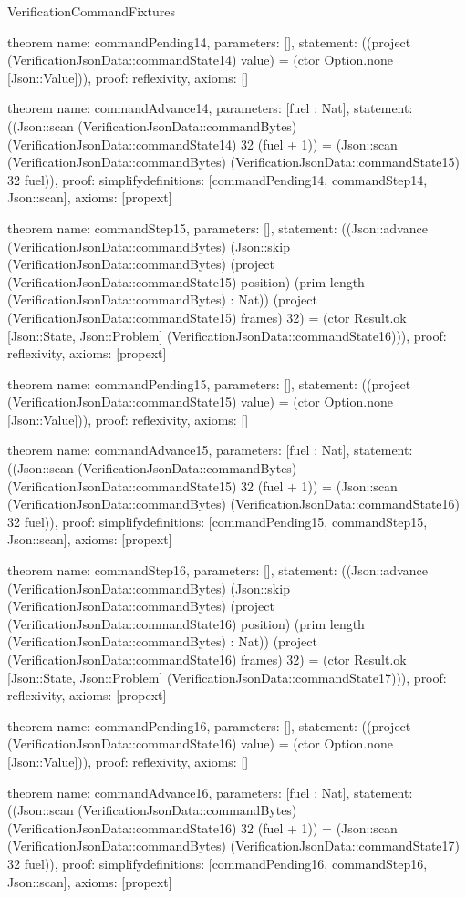 \begin{lexlean}{VerificationCommandFixtures}
\begin{semanticmodule}
theorem{
  name: commandPending14,
  parameters: [],
  statement: ((project (VerificationJsonData::commandState14) value) = (ctor Option.none [Json::Value])),
  proof: reflexivity{},
  axioms: []
}

theorem{
  name: commandAdvance14,
  parameters: [fuel : Nat],
  statement: ((Json::scan (VerificationJsonData::commandBytes) (VerificationJsonData::commandState14) 32 (fuel + 1)) = (Json::scan (VerificationJsonData::commandBytes) (VerificationJsonData::commandState15) 32 fuel)),
  proof: simplify{definitions: [commandPending14, commandStep14, Json::scan]},
  axioms: [propext]
}

theorem{
  name: commandStep15,
  parameters: [],
  statement: ((Json::advance (VerificationJsonData::commandBytes) (Json::skip (VerificationJsonData::commandBytes) (project (VerificationJsonData::commandState15) position) (prim length (VerificationJsonData::commandBytes) : Nat)) (project (VerificationJsonData::commandState15) frames) 32) = (ctor Result.ok [Json::State, Json::Problem] (VerificationJsonData::commandState16))),
  proof: reflexivity{},
  axioms: [propext]
}

theorem{
  name: commandPending15,
  parameters: [],
  statement: ((project (VerificationJsonData::commandState15) value) = (ctor Option.none [Json::Value])),
  proof: reflexivity{},
  axioms: []
}

theorem{
  name: commandAdvance15,
  parameters: [fuel : Nat],
  statement: ((Json::scan (VerificationJsonData::commandBytes) (VerificationJsonData::commandState15) 32 (fuel + 1)) = (Json::scan (VerificationJsonData::commandBytes) (VerificationJsonData::commandState16) 32 fuel)),
  proof: simplify{definitions: [commandPending15, commandStep15, Json::scan]},
  axioms: [propext]
}

theorem{
  name: commandStep16,
  parameters: [],
  statement: ((Json::advance (VerificationJsonData::commandBytes) (Json::skip (VerificationJsonData::commandBytes) (project (VerificationJsonData::commandState16) position) (prim length (VerificationJsonData::commandBytes) : Nat)) (project (VerificationJsonData::commandState16) frames) 32) = (ctor Result.ok [Json::State, Json::Problem] (VerificationJsonData::commandState17))),
  proof: reflexivity{},
  axioms: [propext]
}

theorem{
  name: commandPending16,
  parameters: [],
  statement: ((project (VerificationJsonData::commandState16) value) = (ctor Option.none [Json::Value])),
  proof: reflexivity{},
  axioms: []
}

theorem{
  name: commandAdvance16,
  parameters: [fuel : Nat],
  statement: ((Json::scan (VerificationJsonData::commandBytes) (VerificationJsonData::commandState16) 32 (fuel + 1)) = (Json::scan (VerificationJsonData::commandBytes) (VerificationJsonData::commandState17) 32 fuel)),
  proof: simplify{definitions: [commandPending16, commandStep16, Json::scan]},
  axioms: [propext]
}


\end{semanticmodule}
\end{lexlean}
